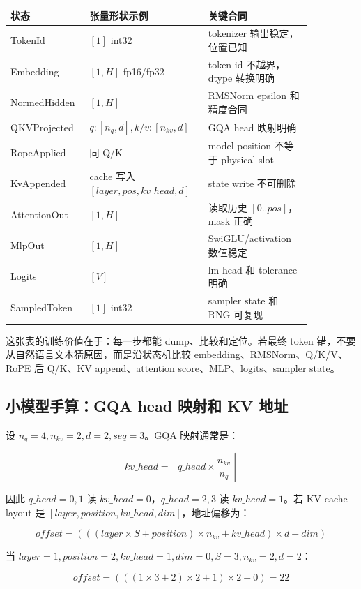 \begin{center}
\begin{tabular}{p{0.20\linewidth}p{0.34\linewidth}p{0.32\linewidth}}
\toprule
状态 & 张量形状示例 & 关键合同 \\
\midrule
TokenId & \([1]\) int32 & tokenizer 输出稳定，位置已知 \\
Embedding & \([1,H]\) fp16/fp32 & token id 不越界，dtype 转换明确 \\
NormedHidden & \([1,H]\) & RMSNorm epsilon 和精度合同 \\
QKVProjected & \(q:[n_q,d], k/v:[n_{kv},d]\) & GQA head 映射明确 \\
RopeApplied & 同 Q/K & model position 不等于 physical slot \\
KvAppended & cache 写入 \([layer,pos,kv\_head,d]\) & state write 不可删除 \\
AttentionOut & \([1,H]\) & 读取历史 \([0..pos]\)，mask 正确 \\
MlpOut & \([1,H]\) & SwiGLU/activation 数值稳定 \\
Logits & \([V]\) & lm head 和 tolerance 明确 \\
SampledToken & \([1]\) int32 & sampler state 和 RNG 可复现 \\
\bottomrule
\end{tabular}
\end{center}

这张表的训练价值在于：每一步都能 dump、比较和定位。若最终 token 错，不要从自然语言文本猜原因，而是沿状态机比较 embedding、RMSNorm、Q/K/V、RoPE 后 Q/K、KV append、attention score、MLP、logits、sampler state。

\subsection{小模型手算：GQA head 映射和 KV 地址}

设 \(n_q=4,n_{kv}=2,d=2,seq=3\)。GQA 映射通常是：

\[
kv\_head = \left\lfloor q\_head \times \frac{n_{kv}}{n_q} \right\rfloor
\]

因此 \(q\_head=0,1\) 读 \(kv\_head=0\)，\(q\_head=2,3\) 读 \(kv\_head=1\)。若 KV cache layout 是 \([layer, position, kv\_head, dim]\)，地址偏移为：

\[
offset = (((layer \times S + position) \times n_{kv} + kv\_head) \times d + dim)
\]

当 \(layer=1, position=2, kv\_head=1, dim=0, S=3,n_{kv}=2,d=2\)：

\[
offset = (((1 \times 3 + 2) \times 2 + 1) \times 2 + 0)=22
\]

